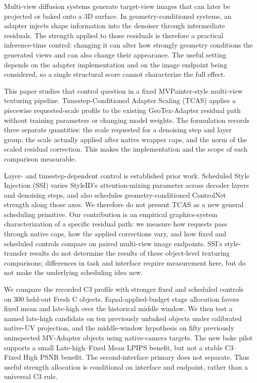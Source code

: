 \documentclass[times,twocolumn,final]{elsarticle}
\begin{document}
Multi-view diffusion systems generate target-view images that can later be projected or baked onto a 3D surface. In geometry-conditioned systems, an adapter injects shape information into the denoiser through intermediate residuals. The strength applied to those residuals is therefore a practical inference-time control: changing it can alter how strongly geometry conditions the generated views and can also change their appearance. The useful setting depends on the adapter implementation and on the image endpoint being considered, so a single structural score cannot characterize the full effect.

This paper studies that control question in a fixed MVPainter-style multi-view texturing pipeline. Timestep-Conditioned Adapter Scaling (TCAS) applies a piecewise requested-scale profile to the existing GeoTex-Adapter residual path without training parameters or changing model weights. The formulation records three separate quantities: the scale requested for a denoising step and layer group, the scale actually applied after native wrapper caps, and the norm of the scaled residual correction. This makes the implementation and the scope of each comparison measurable.

Layer- and timestep-dependent control is established prior work. Scheduled Style Injection (SSI) varies StyleID's attention-mixing parameter across decoder layers and denoising steps, and also schedules geometry-conditioned ControlNet strength along those axes. We therefore do not present TCAS as a new general scheduling primitive. Our contribution is an empirical graphics-system characterization of a specific residual path: we measure how requests pass through native caps, how the applied corrections vary, and how fixed and scheduled controls compare on paired multi-view image endpoints. SSI's style-transfer results do not determine the results of these object-level texturing comparisons; differences in task and interface require measurement here, but do not make the underlying scheduling idea new.

We compare the recorded C3 profile with stronger fixed and scheduled controls on 300 held-out Fresh C objects. Equal-applied-budget stage allocation favors fixed mean and late-high over the historical middle window. We then test a named late-high candidate on ten previously unbaked objects under calibrated native-UV projection, and the middle-window hypothesis on fifty previously uninspected MV-Adapter objects using native-camera targets. The new bake pilot supports a small Late-high--Fixed Mean LPIPS benefit, but not a stable C3--Fixed High PSNR benefit. The second-interface primary does not separate. Thus useful strength allocation is conditional on interface and endpoint, rather than a universal C3 rule.
\end{document}
